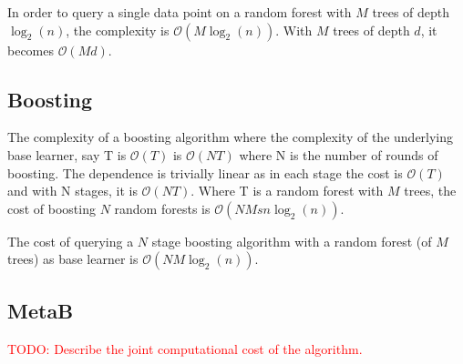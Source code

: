 In order to query a single data point on a random forest with $M$ trees of depth $\log_{2}(n)$, the complexity is $\mathcal{O}(M\log_{2}(n))$. With $M$ trees of depth $d$, it becomes $\mathcal{O}(Md)$.

\subsection{Boosting}

The complexity of a boosting algorithm where the complexity of the underlying base learner, say T is $\mathcal{O}(T)$ is $\mathcal{O}(NT)$ where N is the number of rounds of boosting. The dependence is trivially linear as in each stage the cost is $\mathcal{O}(T)$ and with N stages, it is  $\mathcal{O}(NT)$. Where T is a random forest with $M$ trees, the cost of boosting $N$ random forests is $\mathcal{O}(NMsn\log_{2}(n))$.

The cost of querying a $N$ stage boosting algorithm with a random forest (of $M$ trees) as base learner is $\mathcal{O}(NM\log_{2}(n))$.  

\subsection{MetaB}

\textcolor{red}{TODO: Describe the joint computational cost of the algorithm.} 